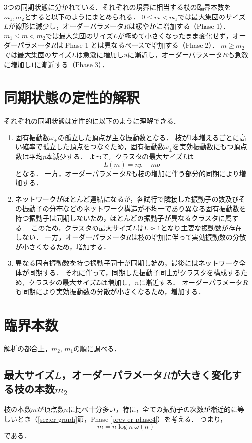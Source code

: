 \documentclass[../main]{subfiles}
\begin{document}
3つの同期状態に分かれている．それぞれの境界に相当する枝の臨界本数を$m_1,m_2$とすると以下のようにまとめられる．
$0\leq m<m_1$では最大集団のサイズ$L$が線形に減少し，オーダーパラメータ$R$は緩やかに増加する（Phase 1）．
$m_1\leq m< m_2$では最大集団のサイズ$L$が極めて小さくなったまま変化せず，オーダーパラメータ$R$は Phase 1 とは異なるペースで増加する（Phase 2）．
$m\geq m_2 $では最大集団のサイズ$L$は急激に増加し$n$に漸近し，オーダーパラメータ$R$も急激に増加し$1$に漸近する（Phase 3）．
\section{同期状態の定性的解釈}
それぞれの同期状態は定性的に以下のように理解できる．
\renewcommand{\labelenumi}{Phase \theenumi}
\begin{enumerate}
    \item 固有振動数$\omega_\pm$の孤立した頂点が主な振動数となる．
    枝が1本増えるごとに高い確率で孤立した頂点をつなぐため，固有振動数$\omega_\pm$を実効振動数にもつ頂点数は平均$p$本減少する．
    よって，クラスタの最大サイズ$L$は
    \begin{equation}
        L(m)=np-mp     
    \end{equation}
    となる．
    一方，オーダーパラメータ$R$も枝の増加に伴う部分的同期により増加する．
    \item ネットワークがほとんど連結になるが，各試行で隣接した振動子の数及びその振動子の分布などのネットワーク構造が不均一であり異なる固有振動数を持つ振動子は同期しないため，ほとんどの振動子が異なるクラスタに属する．
    このため，クラスタの最大サイズ$L$は$L\approx 1$となり主要な振動数が存在しない．
    一方，オーダーパラメータ$R$は枝の増加に伴って実効振動数の分散が小さくなるため，増加する．
    \item 異なる固有振動数を持つ振動子同士が同期し始め，最後にはネットワーク全体が同期する．
    それに伴って，同期した振動子同士がクラスタを構成するため，クラスタの最大サイズ$L$は増加し，$n$に漸近する．
    オーダーパラメータ$R$も同期により実効振動数の分散が小さくなるため，増加する．
\end{enumerate}
\section{臨界本数}
\label{sec:percolate-m}
解析の都合上，$m_2,\ m_1$の順に調べる．
\subsection{最大サイズ$L$，オーダーパラメータ$R$が大きく変化する枝の本数$m_2$}
枝の本数$m$が頂点数$n$に比べ十分多い，特に，全ての振動子の次数が漸近的に等しいとき（\ref{sec:er-graph}節，Phase \ref{prev-er-phase4}）を考える．
つまり，
\begin{equation}
    \label{eq:percolate-m2-assume}
    m= n\log n\ \omega(n)
\end{equation}
である．
\end{document}
